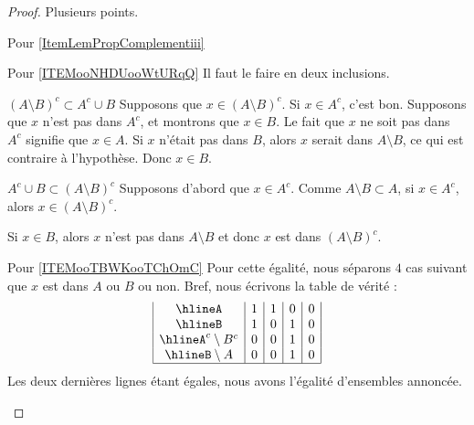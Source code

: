 \begin{proof}
	Plusieurs points.
	\begin{subproof}
		\item[Pour \ref{ItemLemPropComplementiii}]
		\item[Pour \ref{ITEMooNHDUooWtURqQ}]
		Il faut le faire en deux inclusions.
		\begin{subproof}
			\item[\( (A\setminus B)^c\subset A^c\cup B\)]
			Supposons que \( x\in(A\setminus B)^c\). Si \( x\in A^c\), c'est bon. Supposons que \( x\) n'est pas dans \( A^c\), et montrons que \( x\in B\). Le fait que \( x\) ne soit pas dans \( A^c\) signifie que \( x\in A\). Si \( x\) n'était pas dans \( B\), alors \( x\) serait dans \( A\setminus B\), ce qui est contraire à l'hypothèse. Donc \( x\in B\).
			\item[\( A^c\cup B\subset (A\setminus B)^c\)]
			Supposons d'abord que \( x\in A^c\). Comme \( A\setminus B\subset A\), si \( x\in A^c\), alors \( x\in (A\setminus B)^c\).

			Si \( x\in B\), alors \( x\) n'est pas dans \( A\setminus B\) et donc \( x\) est dans \( (A\setminus B)^c\).
		\end{subproof}
		\item[Pour \ref{ITEMooTBWKooTChOmC}]
		Pour cette égalité, nous séparons \( 4\) cas suivant que \( x\) est dans \( A\) ou \( B\) ou non. Bref, nous écrivons la table de vérité :
		\begin{equation}
			\begin{array}{|c|c|c|c|c|}
				\hline%
				A                & 1 & 1 & 0 & 0 \\
				\hline%
				B                & 1 & 0 & 1 & 0 \\
				\hline%
				A^c\setminus B^c & 0 & 0 & 1 & 0 \\
				\hline%
				B\setminus A     & 0 & 0 & 1 & 0 \\
				\hline%
			\end{array}
		\end{equation}
		Les deux dernières lignes étant égales, nous avons l'égalité d'ensembles annoncée.
	\end{subproof}
\end{proof}

